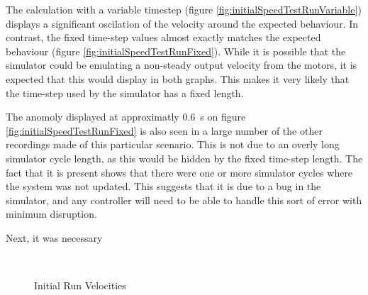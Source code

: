 \documentclass[10pt]{article} \usepackage[a4paper]{geometry}
\begin{document}
The calculation with a variable timestep (figure
\ref{fig:initialSpeedTestRunVariable}) displays a significant oscilation of the
velocity around the expected behaviour.  In contrast, the fixed time-step values
almost exactly matches the expected behaviour (figure
\ref{fig:initialSpeedTestRunFixed}).  While it is possible that the simulator
could be emulating a non-steady output velocity from the motors, it is expected
that this would display in both graphs.  This makes it very likely that the
time-step used by the simulator has a fixed length.

The anomoly displayed at approximatly \SI{0.6}{\second} on figure
\ref{fig:initialSpeedTestRunFixed} is also seen in a large number of the other
recordings made of this particular scenario.  This is not due to an overly long
simulator cycle length, as this would be hidden by the fixed time-step length.
The fact that it is present shows that there were one or more simulator cycles
where the system was not updated.  This suggests that it is due to a bug in the
simulator, and any controller will need to be able to handle this sort of error
with minimum disruption.

Next, it was necessary 

\begin{figure}
 \centering
 \\
 \caption{Initial Run Velocities}
 \label{fig:initialSpeedTestRun}
\end{figure}
\end{document}
